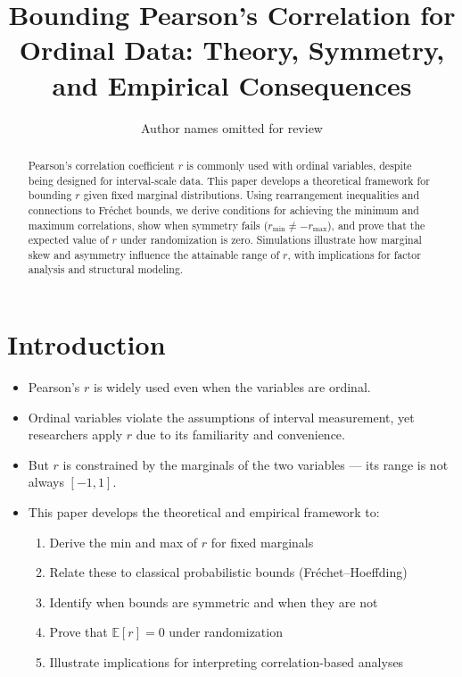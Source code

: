 \documentclass[12pt]{article}
\title{Bounding Pearson’s Correlation for Ordinal Data: Theory, Symmetry, and Empirical Consequences}
\author{Author names omitted for review}
\date{}
\begin{document}
\maketitle

\begin{abstract}
Pearson’s correlation coefficient \( r \) is commonly used with ordinal variables, despite being designed for interval-scale data. This paper develops a theoretical framework for bounding \( r \) given fixed marginal distributions. Using rearrangement inequalities and connections to Fréchet bounds, we derive conditions for achieving the minimum and maximum correlations, show when symmetry fails (\( r_{\min} \ne -r_{\max} \)), and prove that the expected value of \( r \) under randomization is zero. Simulations illustrate how marginal skew and asymmetry influence the attainable range of \( r \), with implications for factor analysis and structural modeling.
\end{abstract}

\tableofcontents
\newpage

\section{Introduction}

\begin{itemize}
  \item Pearson’s \( r \) is widely used even when the variables are ordinal.
  \item Ordinal variables violate the assumptions of interval measurement, yet researchers apply \( r \) due to its familiarity and convenience.
  \item But \( r \) is constrained by the marginals of the two variables — its range is not always \([-1, 1]\).
  \item This paper develops the theoretical and empirical framework to:
    \begin{enumerate}[label=(\roman*)]
      \item Derive the min and max of \( r \) for fixed marginals
      \item Relate these to classical probabilistic bounds (Fréchet–Hoeffding)
      \item Identify when bounds are symmetric and when they are not
      \item Prove that \( \mathbb{E}[r] = 0 \) under randomization
      \item Illustrate implications for interpreting correlation-based analyses
    \end{enumerate}
\end{itemize}
\end{document}
